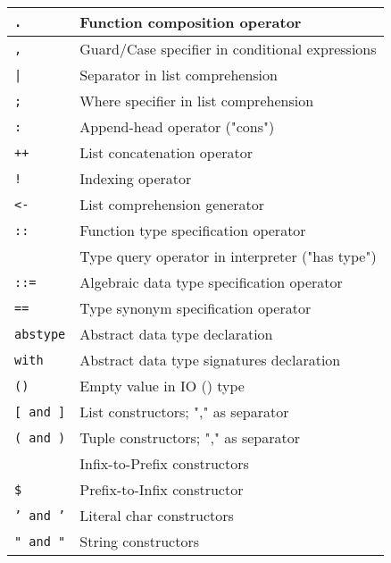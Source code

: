 \documentclass[]{article}
\begin{document}
\begin{tabular}{ | l | l | }
	\hline
	\texttt{.}                      & Function composition operator                     \\ \hline
	\texttt{,}                      & Guard/Case specifier in conditional expressions   \\ \hline
	\texttt{|}                      & Separator in list comprehension                   \\ \hline
	\texttt{;}                      & Where specifier in list comprehension             \\ \hline
	\hline
	\texttt{:}                      & Append-head operator ("cons")                     \\ \hline
	\texttt{++}                     & List concatenation operator                       \\ \hline
	\texttt{!}                      & Indexing operator                                 \\ \hline
	\texttt{<-}                     & List comprehension generator                      \\ \hline
	\hline
	\texttt{::}                     & Function type specification operator              \\ 
	                                & Type query operator in interpreter ("has type")   \\ \hline
	\texttt{::=}                    & Algebraic data type specification operator        \\ \hline
	\texttt{==}                     & Type synonym specification operator               \\ \hline
	\texttt{abstype}                & Abstract data type declaration                    \\ \hline
	\texttt{with}                   & Abstract data type signatures declaration         \\ \hline
	\texttt{()}                     & Empty value in IO () type                         \\ \hline
	\hline
	\texttt{[ and ]}                & List constructors; "," as separator               \\ \hline
	\texttt{( and )}                & Tuple constructors; "," as separator              \\ 
	                                & Infix-to-Prefix constructors                      \\ \hline
	\texttt{\$}                     & Prefix-to-Infix constructor                       \\ \hline
	\texttt{' and '}                & Literal char constructors                         \\ \hline
	\texttt{" and "}                & String constructors                               \\ \hline
\end{tabular}
\end{document}
